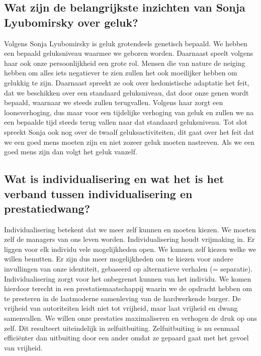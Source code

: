 \documentclass[11pt,a4paper,titlepage]{article}
\begin{document}
\subsection{Wat zijn de belangrijkste inzichten van Sonja Lyubomirsky over geluk?}
Volgens Sonja Lyubomirsky is geluk grotendeels genetisch bepaald. We hebben een bepaald geluksniveau waarmee we geboren worden. Daarnaast speelt volgens haar ook onze persoonlijkheid een grote rol. Mensen die van nature de neiging hebben om alles iets negatiever te zien zullen het ook moeilijker hebben om gelukkig te zijn. Daarnaast spreekt ze ook over hedonistische adaptatie het feit, dat we beschikken over een standaard geluksniveau, dat door onze genen wordt bepaald, waarnaar we steeds zullen terugvallen. Volgens haar zorgt een loonsverhoging, dus maar voor een tijdelijke verhoging van geluk en zullen we na een bepaalde tijd steeds terug vallen naar dat standaard geluksniveau. Tot slot spreekt Sonja ook nog over de twaalf geluksactiviteiten, dit gaat over het feit dat we een goed mens moeten zijn en niet zozeer geluk moeten nastreven. Als we een goed mens zijn dan volgt het geluk vanzelf.

\subsection{Wat is individualisering en wat het is het verband tussen individualisering en prestatiedwang?}
Individualisering betekent dat we meer zelf kunnen en moeten kiezen. We moeten zelf de managers van ons leven worden. Individualisering houdt vrijmaking in. Er liggen voor elk individu vele mogelijkheden open. We kunnen zelf kiezen welke we willen benutten. Er zijn dus meer mogelijkheden om te kiezen voor andere invullingen van onze identiteit, gebaseerd op alternatieve verhalen (= separatie).  \\
Individualisering zorgt voor het onbegrenst kunnen van het individu. We komen hierdoor terecht in een prestatiemaatschappij waarin we de opdracht hebben om te presteren in de laatmoderne samenleving van de hardwerkende burger. De vrijheid van autoriteiten leidt niet tot vrijheid, maar laat vrijheid en dwang samenvallen.  We willen onze prestaties maximaliseren en verhogen de druk op ons zelf. Dit resulteert uiteindelijk in zelfuitbuiting. Zelfuitbuiting is nu eenmaal efficiënter dan uitbuiting door een ander omdat ze gepaard gaat met het gevoel van vrijheid.
\end{document}
